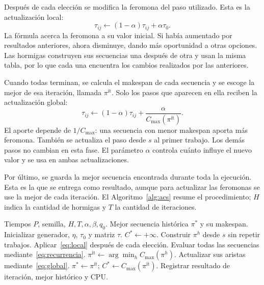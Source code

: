 \documentclass[journal]{IEEEtran}
\begin{document}
Después de cada elección se modifica la feromona del paso utilizado. Esta es la actualización local:
\begin{equation}
\tau_{ij}\leftarrow(1-\alpha)\tau_{ij}+\alpha\tau_0.
\label{eq:local}
\end{equation}
La fórmula acerca la feromona a su valor inicial. Si había aumentado por resultados anteriores, ahora disminuye, dando más oportunidad a otras opciones. Las hormigas construyen sus secuencias una después de otra y usan la misma tabla, por lo que cada una encuentra los cambios realizados por las anteriores.

Cuando todas terminan, se calcula el makespan de cada secuencia y se escoge la mejor de esa iteración, llamada $\pi^{\mathrm{it}}$. Solo los pasos que aparecen en ella reciben la actualización global:
\begin{equation}
\tau_{ij}\leftarrow(1-\alpha)\tau_{ij}+\frac{\alpha}{C_{\max}(\pi^{\mathrm{it}})}.
\label{eq:global}
\end{equation}
El aporte depende de $1/C_{\max}$: una secuencia con menor makespan aporta más feromona. También se actualiza el paso desde $s$ al primer trabajo. Los demás pasos no cambian en esta fase. El parámetro $\alpha$ controla cuánto influye el nuevo valor y se usa en ambas actualizaciones.

Por último, se guarda la mejor secuencia encontrada durante toda la ejecución. Esta es la que se entrega como resultado, aunque para actualizar las feromonas se use la mejor de cada iteración. El Algoritmo~\ref{alg:acs} resume el procedimiento; $H$ indica la cantidad de hormigas y $T$ la cantidad de iteraciones.

\begin{algorithm}[t]
\caption{ACS adaptado al PFSP}
\label{alg:acs}
\footnotesize
\begin{algorithmic}[1]
\REQUIRE Tiempos $P$, semilla, $H,T,\alpha,\beta,q_0$.
\ENSURE Mejor secuencia histórica $\pi^*$ y su makespan.
\STATE Inicializar generador, $\eta$, $\tau_0$ y matriz $\tau$.
\STATE $C^*\leftarrow+\infty$.
    \STATE Construir $\pi^h$ desde $s$ sin repetir trabajos.
    \STATE Aplicar~\eqref{eq:local} después de cada elección.
  \ENDFOR
  \STATE Evaluar todas las secuencias mediante~\eqref{eq:recurrencia}.
  \STATE $\pi^{\mathrm{it}}\leftarrow\arg\min_h C_{\max}(\pi^h)$.
  \STATE Actualizar sus aristas mediante~\eqref{eq:global}.
    \STATE $\pi^*\leftarrow\pi^{\mathrm{it}}$; $C^*\leftarrow C_{\max}(\pi^{\mathrm{it}})$.
  \ENDIF
  \STATE Registrar resultado de iteración, mejor histórico y CPU.
\ENDFOR
\end{algorithmic}
\end{algorithm}
\end{document}
